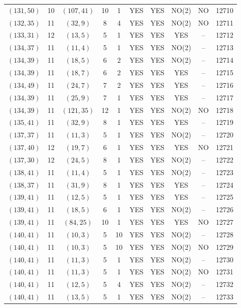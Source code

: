 \begin{longtable}{|c|c|c|c|c|c|c|c|c|c|}
$(131, 50)$ & 10 & $(107, 41)$ & 10 & 1 & YES & YES & NO(2) & NO & 12710\\
$(132, 35)$ & 11 & $(32, 9)$ & 8 & 4 & YES & YES & NO(2) & NO & 12711\\
$(133, 31)$ & 12 & $(13, 5)$ & 5 & 1 & YES & YES & YES & -- & 12712\\
$(134, 37)$ & 11 & $(11, 4)$ & 5 & 1 & YES & YES & NO(2) & -- & 12713\\
$(134, 39)$ & 11 & $(18, 5)$ & 6 & 2 & YES & YES & NO(2) & -- & 12714\\
$(134, 39)$ & 11 & $(18, 7)$ & 6 & 2 & YES & YES & YES & -- & 12715\\
$(134, 49)$ & 11 & $(24, 7)$ & 7 & 2 & YES & YES & YES & -- & 12716\\
$(134, 39)$ & 11 & $(25, 9)$ & 7 & 1 & YES & YES & YES & -- & 12717\\
$(134, 39)$ & 11 & $(121, 35)$ & 12 & 1 & YES & YES & NO(2) & NO & 12718\\
$(135, 41)$ & 11 & $(32, 9)$ & 8 & 1 & YES & YES & YES & -- & 12719\\
$(137, 37)$ & 11 & $(11, 3)$ & 5 & 1 & YES & YES & NO(2) & -- & 12720\\
$(137, 40)$ & 12 & $(19, 7)$ & 6 & 1 & YES & YES & YES & NO & 12721\\
$(137, 30)$ & 12 & $(24, 5)$ & 8 & 1 & YES & YES & NO(2) & -- & 12722\\
$(138, 41)$ & 11 & $(11, 4)$ & 5 & 1 & YES & YES & NO(2) & -- & 12723\\
$(138, 37)$ & 11 & $(31, 9)$ & 8 & 1 & YES & YES & YES & -- & 12724\\
$(139, 41)$ & 11 & $(12, 5)$ & 5 & 1 & YES & YES & YES & -- & 12725\\
$(139, 41)$ & 11 & $(18, 5)$ & 6 & 1 & YES & YES & NO(2) & -- & 12726\\
$(139, 41)$ & 11 & $(84, 25)$ & 10 & 1 & YES & YES & YES & NO & 12727\\
$(140, 41)$ & 11 & $(10, 3)$ & 5 & 10 & YES & YES & NO(2) & -- & 12728\\
$(140, 41)$ & 11 & $(10, 3)$ & 5 & 10 & YES & YES & NO(2) & NO & 12729\\
$(140, 41)$ & 11 & $(11, 3)$ & 5 & 1 & YES & YES & NO(2) & -- & 12730\\
$(140, 41)$ & 11 & $(11, 3)$ & 5 & 1 & YES & YES & NO(2) & NO & 12731\\
$(140, 41)$ & 11 & $(12, 5)$ & 5 & 4 & YES & YES & NO(2) & -- & 12732\\
$(140, 41)$ & 11 & $(13, 5)$ & 5 & 1 & YES & YES & NO(2) & -- & 12733\\

\end{longtable}
